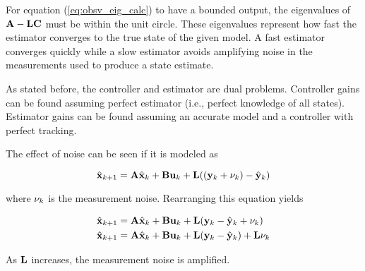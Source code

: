 For equation (\ref{eq:obsv_eig_calc}) to have a bounded output, the eigenvalues
of $\mathbf{A} - \mathbf{L}\mathbf{C}$ must be within the unit circle. These eigenvalues
represent how fast the estimator converges to the true state of the given
\gls{model}. A fast estimator converges quickly while a slow estimator avoids
amplifying noise in the measurements used to produce a state estimate.

As stated before, the controller and estimator are dual problems. Controller
gains can be found assuming perfect estimator (i.e., perfect knowledge of all
\glspl{state}). Estimator gains can be found assuming an accurate \gls{model}
and a controller with perfect \gls{tracking}.

The effect of noise can be seen if it is modeled
 as

\begin{equation*}
  \hat{\mathbf{x}}_{k+1} = \mathbf{A}\hat{\mathbf{x}}_k + \mathbf{B}\mathbf{u}_k +
    \mathbf{L} ((\mathbf{y}_k + \mathbf{\nu}_k) - \hat{\mathbf{y}}_k) \\
\end{equation*}

where $\mathbf{\nu}_k$ is the measurement noise. Rearranging this equation yields

\begin{align*}
  \hat{\mathbf{x}}_{k+1} &= \mathbf{A}\hat{\mathbf{x}}_k + \mathbf{B}\mathbf{u}_k +
    \mathbf{L} (\mathbf{y}_k - \hat{\mathbf{y}}_k + \mathbf{\nu}_k) \\
  \hat{\mathbf{x}}_{k+1} &= \mathbf{A}\hat{\mathbf{x}}_k + \mathbf{B}\mathbf{u}_k +
    \mathbf{L} (\mathbf{y}_k - \hat{\mathbf{y}}_k) + \mathbf{L}\mathbf{\nu}_k
\end{align*}

As $\mathbf{L}$ increases, the measurement noise is amplified.
